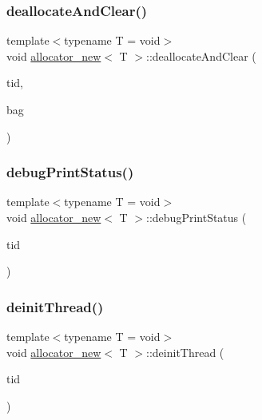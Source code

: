 \subsubsection{\texorpdfstring{deallocate\+And\+Clear()}{deallocateAndClear()}}
{\footnotesize\ttfamily template$<$typename T  = void$>$ \\
void \hyperlink{classallocator__new}{allocator\+\_\+new}$<$ T $>$\+::deallocate\+And\+Clear (\begin{DoxyParamCaption}\item[{const int}]{tid,  }\item[{\hyperlink{classblockbag}{blockbag}$<$ T $>$ $\ast$const}]{bag }\end{DoxyParamCaption})\hspace{0.3cm}{\ttfamily [inline]}}

\mbox{\label{classallocator__new_a6891234824482b3c8b83a1b91521b5e3}} 
\subsubsection{\texorpdfstring{debug\+Print\+Status()}{debugPrintStatus()}}
{\footnotesize\ttfamily template$<$typename T  = void$>$ \\
void \hyperlink{classallocator__new}{allocator\+\_\+new}$<$ T $>$\+::debug\+Print\+Status (\begin{DoxyParamCaption}\item[{const int}]{tid }\end{DoxyParamCaption})\hspace{0.3cm}{\ttfamily [inline]}}

\mbox{\label{classallocator__new_a913b5e0ed2d2cc75c2e7d03e1a75d47b}} 
\subsubsection{\texorpdfstring{deinit\+Thread()}{deinitThread()}}
{\footnotesize\ttfamily template$<$typename T  = void$>$ \\
void \hyperlink{classallocator__new}{allocator\+\_\+new}$<$ T $>$\+::deinit\+Thread (\begin{DoxyParamCaption}\item[{const int}]{tid }\end{DoxyParamCaption})\hspace{0.3cm}{\ttfamily [inline]}}

